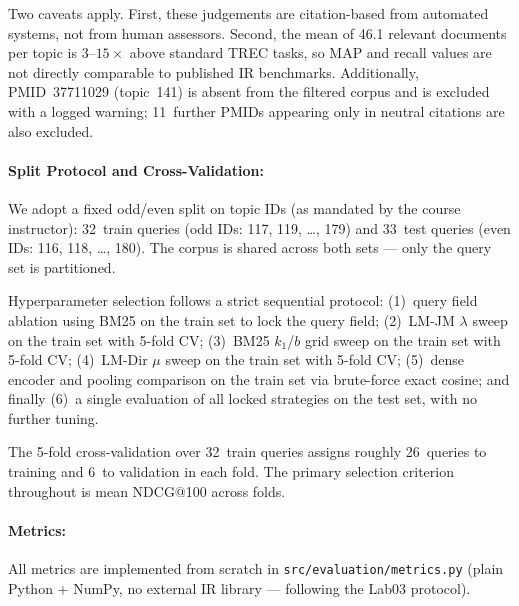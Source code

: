 Two caveats apply.  First, these judgements are citation-based from automated
systems, not from human assessors.  Second, the mean of 46.1 relevant documents
per topic is $3\text{--}15\times$ above standard TREC tasks, so MAP and recall
values are not directly comparable to published IR benchmarks.
Additionally, PMID~37711029 (topic~141) is absent from the filtered corpus
and is excluded with a logged warning; 11~further PMIDs appearing only in
neutral citations are also excluded.

\paragraph{Split Protocol and Cross-Validation:}
We adopt a fixed odd/even split on topic IDs (as mandated by the course
instructor): 32~train queries (odd IDs: 117, 119, \ldots, 179) and
33~test queries (even IDs: 116, 118, \ldots, 180).  The corpus is shared
across both sets --- only the query set is partitioned.

Hyperparameter selection follows a strict sequential protocol:
(1)~query field ablation using BM25 on the train set to lock the query field;
(2)~LM-JM $\lambda$ sweep on the train set with 5-fold CV;
(3)~BM25 $k_1$/$b$ grid sweep on the train set with 5-fold CV;
(4)~LM-Dir $\mu$ sweep on the train set with 5-fold CV;
(5)~dense encoder and pooling comparison on the train set via brute-force
exact cosine; and finally
(6)~a single evaluation of all locked strategies on the test set, with no
further tuning.

The 5-fold cross-validation over 32~train queries assigns roughly
26~queries to training and 6~to validation in each fold.
The primary selection criterion throughout is mean NDCG@100 across folds.

\paragraph{Metrics:}
All metrics are implemented from scratch
in \texttt{src/\allowbreak evaluation/\allowbreak metrics\allowbreak .py}
(plain Python + NumPy, no external IR library ---
following the Lab03 protocol).

